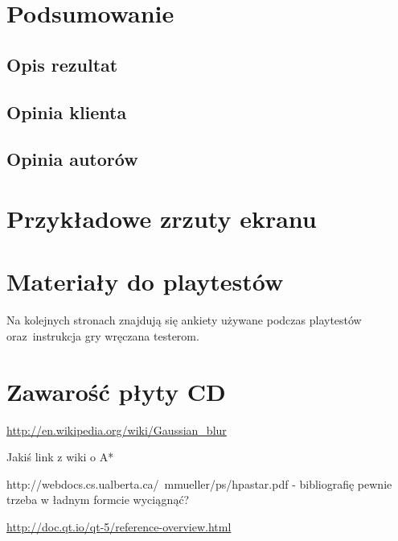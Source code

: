 \documentclass[licencjacka]{pracamgr}
\begin{document}
\chapter{Podsumowanie}

  \section{Opis rezultat}

  \section{Opinia klienta}

  \section{Opinia autorów}

\appendix

\chapter{Przykładowe zrzuty ekranu}

\chapter{Materiały do playtestów}
Na kolejnych stronach znajdują się ankiety używane podczas playtestów
oraz~instrukcja gry wręczana testerom.

    
    
    

  \chapter{Zawarość płyty CD}


\begin{thebibliography}{99}
  \item{\url{http://en.wikipedia.org/wiki/Gaussian_blur}}
  \item{Jakiś link z wiki o A*}
  \item{http://webdocs.cs.ualberta.ca/~mmueller/ps/hpastar.pdf - bibliografię pewnie trzeba w ładnym formcie wyciągnąć?}
  \item{\url{http://doc.qt.io/qt-5/reference-overview.html}}

\end{thebibliography}
\end{document}
